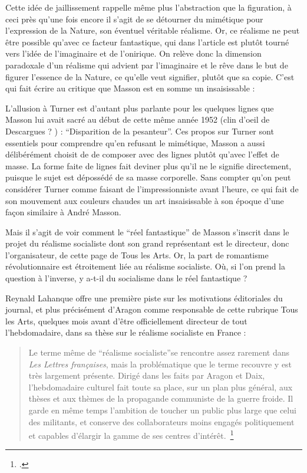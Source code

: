 	  Cette idée de jaillissement rappelle même plus l’abstraction que la figuration, à ceci près qu’une fois encore il s’agit de se détourner du mimétique pour l’expression de la Nature, son éventuel véritable réalisme. Or, ce réalisme ne peut être possible qu’avec ce facteur fantastique, qui dans l’article est plutôt tourné vers l’idée de l’imaginaire et de l’onirique. On relève donc la dimension paradoxale d’un réalisme qui advient par l’imaginaire et le rêve dans le but de figurer l’essence de la Nature, ce qu’elle veut signifier, plutôt que sa copie. C’est qui fait écrire au critique que Masson est en somme un insaisissable : 
 
L’allusion à Turner est d’autant plus parlante pour les quelques lignes que Masson lui avait sacré au début de cette même année 1952 (clin d’oeil de Descargues ? ) : \enquote{Disparition de la pesanteur}. Ces propos sur Turner sont essentiels pour comprendre qu’en refusant le mimétique, Masson a aussi délibérément choisit de de composer avec des lignes plutôt qu’avec l’effet de masse. La forme faite de lignes fait deviner plus qu’il ne le signifie directement, puisque le sujet est dépossédé de sa masse corporelle. Sans compter qu’on peut considérer Turner comme faisant de l’impressionniste avant l’heure, ce qui fait de son mouvement aux couleurs chaudes un art insaisissable à son époque d’une façon similaire à André Masson. 

	Mais il s’agit de voir comment le \enquote{réel fantastique} de Masson s’inscrit dans le projet du réalisme socialiste dont son grand représentant est le directeur, donc l’organisateur, de cette page de Tous les Arts. Or, la part de romantisme révolutionnaire est étroitement liée au réalisme socialiste. Où, si l’on prend la question à l’inverse, y a-t-il du socialisme dans le réel fantastique ? 

	Reynald Lahanque offre une première piste sur les motivations éditoriales du journal, et plus précisément d’Aragon comme responsable de cette rubrique Tous les Arts, quelques mois avant d’être officiellement directeur de tout l’hebdomadaire, dans sa thèse sur le réalisme socialiste en France : 

\begin{quote}
Le terme même de \enquote{réalisme socialiste}se rencontre assez rarement dans \emph{Les Lettres françaises}, mais la problématique que le terme recouvre y est très largement présente. Dirigé dans les faits par Aragon et Daix, l'hebdomadaire culturel fait toute sa place, sur un plan plus général, aux thèses et aux thèmes de la propagande communiste de la guerre froide. Il garde en même temps l'ambition de toucher un public plus large que celui des militants, et conserve des collaborateurs moins engagés politiquement et capables d'élargir la gamme de ses centres d’intérêt. \footcite{}\end{quote}

